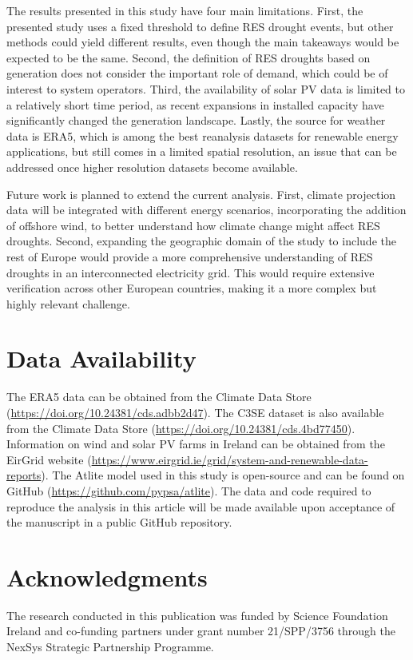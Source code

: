 \documentclass[preprint, 12pt]{elsarticle}
\begin{document}
The results presented in this study have four main limitations. First, the presented study uses a fixed threshold to define RES drought events, but other methods could yield different results, even though the main takeaways would be expected to be the same. Second, the definition of RES droughts based on generation does not consider the important role of demand, which could be of interest to system operators. Third, the availability of solar PV data is limited to a relatively short time period, as recent expansions in installed capacity have significantly changed the generation landscape. Lastly, the source for weather data is ERA5, which is among the best reanalysis datasets for renewable energy applications, but still comes in a limited spatial resolution, an issue that can be addressed once higher resolution datasets become available. 

Future work is planned to extend the current analysis. First, climate projection data will be integrated with different energy scenarios, incorporating the addition of offshore wind, to better understand how climate change might affect RES droughts. Second, expanding the geographic domain of the study to include the rest of Europe would provide a more comprehensive understanding of RES droughts in an interconnected electricity grid. This would require extensive verification across other European countries, making it a more complex but highly relevant challenge.

\section*{Data Availability}

The ERA5 data can be obtained from the Climate Data Store (\url{https://doi.org/10.24381/cds.adbb2d47}). The C3SE dataset is also available from the Climate Data Store (\url{https://doi.org/10.24381/cds.4bd77450}). Information on wind and solar PV farms in Ireland can be obtained from the EirGrid website (\url{https://www.eirgrid.ie/grid/system-and-renewable-data-reports}). The Atlite model used in this study is open-source and can be found on GitHub (\url{https://github.com/pypsa/atlite}). The data and code required to reproduce the analysis in this article will be made available upon acceptance of the manuscript in a public GitHub repository.

\section*{Acknowledgments}

The research conducted in this publication was funded by Science Foundation Ireland and co-funding partners under grant number 21/SPP/3756 through the NexSys Strategic Partnership Programme.



\end{document}
